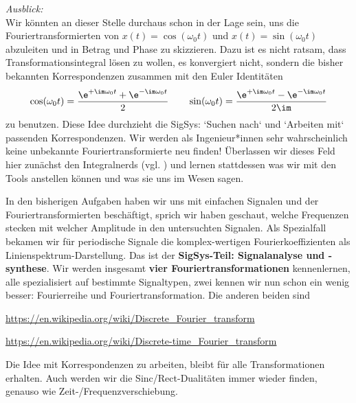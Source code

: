 \begin{mdframed}
\textit{Ausblick:}
%
\\\noindent Wir könnten an dieser Stelle durchaus schon in der Lage sein, uns die
Fouriertransformierten von $x(t) = \cos(\omega_0 t)$ und $x(t) = \sin(\omega_0 t)$
abzuleiten und in Betrag und Phase zu skizzieren.
%
Dazu ist es nicht ratsam, dass Transformationsintegral lösen zu wollen,
es konvergiert nicht, sondern die bisher bekannten Korrespondenzen zusammen
mit den Euler Identitäten
\begin{align}
\cos(\omega_0 t) = \frac{\e^{+\im\omega_0 t}+\e^{-\im\omega_0 t}}{2}\qquad
\sin(\omega_0 t) = \frac{\e^{+\im\omega_0 t}-\e^{-\im\omega_0 t}}{2\im}
\end{align}
zu benutzen.
%
Diese Idee durchzieht die SigSys: `Suchen nach` und `Arbeiten mit` passenden
Korrespondenzen. Wir werden als Ingenieur*innen sehr wahrscheinlich keine unbekannte
Fouriertransformierte neu finden! Überlassen wir dieses Feld hier zunächst
den Integralnerds (vgl. \cite{Gradshteyn2007}) und lernen
stattdessen was wir mit den Tools anstellen können und was sie uns im Wesen sagen.
\end{mdframed}

%
In den bisherigen Aufgaben haben wir uns mit einfachen Signalen und der
Fouriertransformierten beschäftigt, sprich wir haben geschaut, welche Frequenzen
stecken mit welcher Amplitude in den untersuchten Signalen.
%
Als Spezialfall bekamen wir für periodische Signale die komplex-wertigen Fourierkoeffizienten als Linienspektrum-Darstellung.
%
Das ist der \textbf{SigSys-Teil: Signalanalyse und -synthese}. Wir werden insgesamt
\textbf{vier Fouriertransformationen} kennenlernen, alle spezialisiert auf bestimmte
Signaltypen, zwei kennen wir nun schon ein wenig besser: Fourierreihe und
Fouriertransformation.
Die anderen beiden sind

\url{https://en.wikipedia.org/wiki/Discrete_Fourier_transform}

\url{https://en.wikipedia.org/wiki/Discrete-time_Fourier_transform}

Die Idee mit Korrespondenzen zu arbeiten, bleibt für alle Transformationen
erhalten. Auch werden wir die Sinc/Rect-Dualitäten immer wieder finden,
genauso wie Zeit-/Frequenzverschiebung.




\newpage

